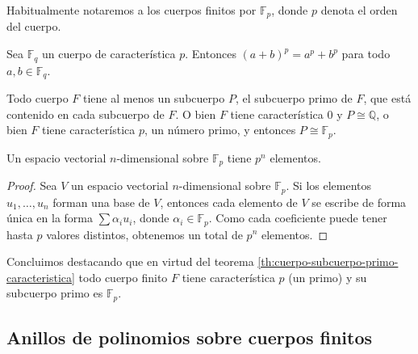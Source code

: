 Habitualmente notaremos a los cuerpos finitos por \(\mathbb F_p\), donde \(p\) denota el orden del cuerpo.

\begin{proposition}
  \label{prop:freshmans-dream}
  Sea \(\mathbb F_q\) un cuerpo de característica \(p\).
  Entonces \((a + b)^{p} = a^{p} + b^{p}\) para todo \(a, b \in \mathbb F_q\).
\end{proposition}

\begin{theorem}
  \label{th:cuerpo-subcuerpo-primo-caracteristica}
  Todo cuerpo \(F\) tiene al menos un subcuerpo \(P\), el subcuerpo primo de \(F\), que está contenido en cada subcuerpo de \(F\).
  O bien \(F\) tiene característica \(0\) y \(P \cong \mathbb Q\), o bien \(F\) tiene característica \(p\), un número primo, y entonces \(P \cong \mathbb F_p\).
\end{theorem}

\begin{lemma}
  Un espacio vectorial \(n\)-dimensional sobre \(\mathbb F_p\) tiene \(p^n\) elementos.
\end{lemma}

\begin{proof}
  Sea \(V\) un espacio vectorial \(n\)-dimensional sobre \(\mathbb F_p\).
  Si los elementos \(u_1, \dots, u_n\) forman una base de \(V\), entonces cada elemento de \(V\) se escribe de forma única en la forma \(\sum \alpha_iu_i\), donde \(\alpha_i \in \mathbb F_p\).
  Como cada coeficiente puede tener hasta \(p\) valores distintos, obtenemos un total de \(p^n\) elementos.
\end{proof}

Concluimos destacando que en virtud del teorema \ref{th:cuerpo-subcuerpo-primo-caracteristica} todo cuerpo finito \(F\) tiene característica \(p\) (un primo) y su subcuerpo primo es \(\mathbb F_p\).

\subsection{Anillos de polinomios sobre cuerpos finitos}

